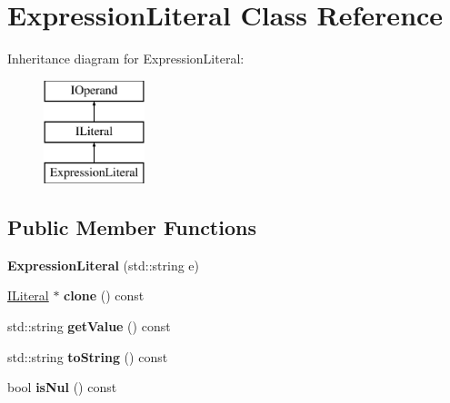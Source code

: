 \hypertarget{class_expression_literal}{}\section{Expression\+Literal Class Reference}
\label{class_expression_literal}
Inheritance diagram for Expression\+Literal\+:\begin{figure}[H]
\begin{center}
\leavevmode
\includegraphics[height=3.000000cm]{class_expression_literal}
\end{center}
\end{figure}
\subsection*{Public Member Functions}
\begin{DoxyCompactItemize}
\item 
{\bfseries Expression\+Literal} (std\+::string e)\hypertarget{class_expression_literal_a0b252afdd04547772271eedb80e99b4b}{}\label{class_expression_literal_a0b252afdd04547772271eedb80e99b4b}

\item 
\hyperlink{class_i_literal}{I\+Literal} $\ast$ {\bfseries clone} () const \hypertarget{class_expression_literal_a4052dfbcad54d3476623cd938a00bf7c}{}\label{class_expression_literal_a4052dfbcad54d3476623cd938a00bf7c}

\item 
std\+::string {\bfseries get\+Value} () const \hypertarget{class_expression_literal_a92205078bc9b497149016a5339ae9098}{}\label{class_expression_literal_a92205078bc9b497149016a5339ae9098}

\item 
std\+::string {\bfseries to\+String} () const \hypertarget{class_expression_literal_a50ac701d0890ed5b2a9258e513b07cdd}{}\label{class_expression_literal_a50ac701d0890ed5b2a9258e513b07cdd}

\item 
bool {\bfseries is\+Nul} () const \hypertarget{class_expression_literal_ae74147738ce25237b92c0e83d938883e}{}\label{class_expression_literal_ae74147738ce25237b92c0e83d938883e}

\end{DoxyCompactItemize}
